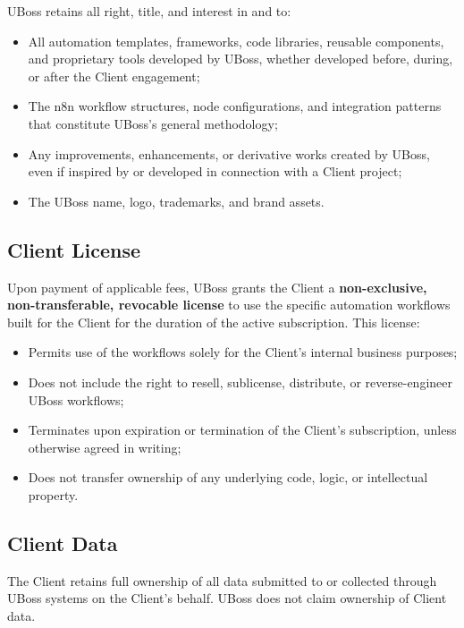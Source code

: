 \documentclass[11pt,letterpaper,parskip=half]{scrartcl}
\begin{document}
UBoss retains all right, title, and interest in and to:

\begin{itemize}[nosep, leftmargin=1.5em]
    \item All automation templates, frameworks, code libraries, reusable components, and proprietary tools developed by UBoss, whether developed before, during, or after the Client engagement;
    \item The n8n workflow structures, node configurations, and integration patterns that constitute UBoss's general methodology;
    \item Any improvements, enhancements, or derivative works created by UBoss, even if inspired by or developed in connection with a Client project;
    \item The UBoss name, logo, trademarks, and brand assets.
\end{itemize}

\subsection{Client License}

Upon payment of applicable fees, UBoss grants the Client a \textbf{non-exclusive, non-transferable, revocable license} to use the specific automation workflows built for the Client for the duration of the active subscription. This license:

\begin{itemize}[nosep, leftmargin=1.5em]
    \item Permits use of the workflows solely for the Client's internal business purposes;
    \item Does not include the right to resell, sublicense, distribute, or reverse-engineer UBoss workflows;
    \item Terminates upon expiration or termination of the Client's subscription, unless otherwise agreed in writing;
    \item Does not transfer ownership of any underlying code, logic, or intellectual property.
\end{itemize}

\subsection{Client Data}

The Client retains full ownership of all data submitted to or collected through UBoss systems on the Client's behalf. UBoss does not claim ownership of Client data.
\end{document}
